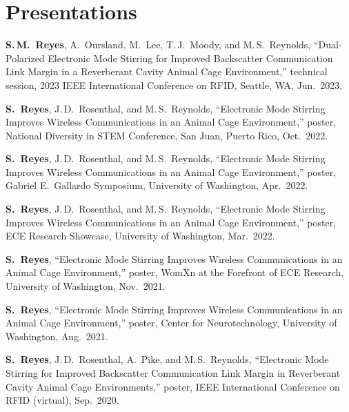 \documentclass[11pt,letterpaper]{article}
\newenvironment{publist}[1]{\begin{enumerate}[label={[#1\arabic*]}, leftmargin=2.6em, itemsep=4pt]}{\end{enumerate}}
\newcommand{\me}[1]{\textbf{#1}}   %
\begin{document}
\section{Presentations}
\begin{publist}{P}
  \item \me{S.\,M.\ Reyes}, A.\ Oursland, M.\ Lee, T.\,J.\ Moody, and M.\,S.\ Reynolds,
        ``Dual-Polarized Electronic Mode Stirring for Improved Backscatter Communication Link Margin in a Reverberant Cavity Animal Cage Environment,''
        technical session, 2023 IEEE International Conference on RFID, Seattle, WA, Jun.\ 2023.
  \item \me{S.\ Reyes}, J.\,D.\ Rosenthal, and M.\,S.\ Reynolds,
        ``Electronic Mode Stirring Improves Wireless Communications in an Animal Cage Environment,''
        poster, National Diversity in STEM Conference, San Juan, Puerto Rico, Oct.\ 2022.
  \item \me{S.\ Reyes}, J.\,D.\ Rosenthal, and M.\,S.\ Reynolds,
        ``Electronic Mode Stirring Improves Wireless Communications in an Animal Cage Environment,''
        poster, Gabriel E.\ Gallardo Symposium, University of Washington, Apr.\ 2022.
  \item \me{S.\ Reyes}, J.\,D.\ Rosenthal, and M.\,S.\ Reynolds,
        ``Electronic Mode Stirring Improves Wireless Communications in an Animal Cage Environment,''
        poster, ECE Research Showcase, University of Washington, Mar.\ 2022.
  \item \me{S.\ Reyes},
        ``Electronic Mode Stirring Improves Wireless Communications in an Animal Cage Environment,''
        poster, WomXn at the Forefront of ECE Research, University of Washington, Nov.\ 2021.
  \item \me{S.\ Reyes},
        ``Electronic Mode Stirring Improves Wireless Communications in an Animal Cage Environment,''
        poster, Center for Neurotechnology, University of Washington, Aug.\ 2021.
  \item \me{S.\ Reyes}, J.\,D.\ Rosenthal, A.\ Pike, and M.\,S.\ Reynolds,
        ``Electronic Mode Stirring for Improved Backscatter Communication Link Margin in Reverberant Cavity Animal Cage Environments,''
        poster, IEEE International Conference on RFID (virtual), Sep.\ 2020.
\end{publist}

\end{document}
